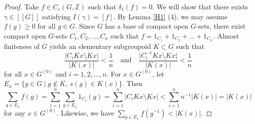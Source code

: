 \documentclass[11pt]{article}
\theoremstyle{definition}
\newcommand{\Z}{\mathbb{Z}}
\begin{document}
\begin{proof}
Take $f\in C_c(G,\Z)$ such that $\delta_1(f)=0$. 
We will show that 
there exists $\gamma\in[[G]]$ satisfying $I(\gamma)=[f]$. 
By Lemma \ref{H1} (4), we may assume $f(g)\geq0$ for all $g\in G$. 
Since $G$ has a base of compact open $G$-sets, 
there exist compact open $G$-sets $C_1,C_2,\dots,C_n$ such that 
$f=1_{C_1}+1_{C_2}+\dots+1_{C_n}$. 
Almost finiteness of $G$ yields 
an elementary subgroupoid $K\subset G$ such that 
\[
\frac{\lvert C_iKx\setminus Kx\rvert}{\lvert K(x)\rvert}
<\frac{1}{n}\quad\text{and}\quad
\frac{\lvert C_i^{-1}Kx\setminus Kx\rvert}{\lvert K(x)\rvert}
<\frac{1}{n}
\]
for all $x\in G^{(0)}$ and $i=1,2,\dots,n$. 
For $x\in G^{(0)}$, let $E_x=\{g\in G\mid g\notin K,\ s(g)\in K(x)\}$. 
Then
\[
\sum_{g\in E_x}f(g)=\sum_{i=1}^n\sum_{g\in E_x}1_{C_i}(g)
=\sum_{i=1}^n\lvert C_iKx\setminus Kx\rvert
<\sum_{i=1}^nn^{-1}\lvert K(x)\rvert=\lvert K(x)\rvert
\]
for any $x\in G^{(0)}$. 
Likewise, we have $\sum_{g\in E_x}f(g^{-1})<\lvert K(x)\rvert$. 


\end{proof}
\end{document}
